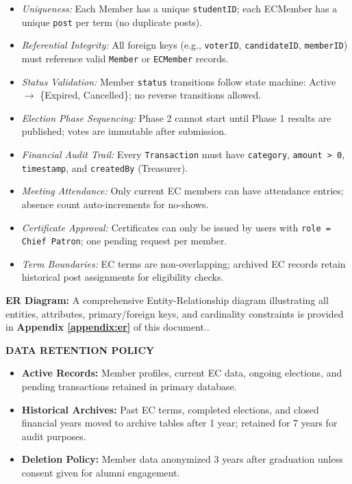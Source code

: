 \documentclass[12pt,a4paper]{article}
\begin{document}
\begin{itemize}[noitemsep]
  \item \textit{Uniqueness:} Each Member has a unique \texttt{studentID}; each ECMember has a unique \texttt{post} per term (no duplicate posts).
  \item \textit{Referential Integrity:} All foreign keys (e.g., \texttt{voterID}, \texttt{candidateID}, \texttt{memberID}) must reference valid \texttt{Member} or \texttt{ECMember} records.
  \item \textit{Status Validation:} Member \texttt{status} transitions follow state machine: Active $\rightarrow$ \{Expired, Cancelled\}; no reverse transitions allowed.
  \item \textit{Election Phase Sequencing:} Phase 2 cannot start until Phase 1 results are published; votes are immutable after submission.
  \item \textit{Financial Audit Trail:} Every \texttt{Transaction} must have \texttt{category}, \texttt{amount > 0}, \texttt{timestamp}, and \texttt{createdBy} (Treasurer).
  \item \textit{Meeting Attendance:} Only current EC members can have attendance entries; absence count auto-increments for no-shows.
  \item \textit{Certificate Approval:} Certificates can only be issued by users with \texttt{role = Chief Patron}; one pending request per member.
  \item \textit{Term Boundaries:} EC terms are non-overlapping; archived EC records retain historical post assignments for eligibility checks.
\end{itemize}

\vspace{4pt}
\begin{tcolorbox}[significancestyle]
\textbf{ER Diagram:} A comprehensive Entity-Relationship diagram illustrating all entities, attributes, primary/foreign keys, and cardinality constraints is provided in \textbf{Appendix \ref{appendix:er}} of this document..
\end{tcolorbox}

\vspace{4pt}
\textbf{\small\color{Teal}DATA RETENTION POLICY}\vspace{4pt}

\begin{itemize}[noitemsep]
  \item \textbf{Active Records:} Member profiles, current EC data, ongoing elections, and pending transactions retained in primary database.
  \item \textbf{Historical Archives:} Past EC terms, completed elections, and closed financial years moved to archive tables after 1 year; retained for 7 years for audit purposes.
  \item \textbf{Deletion Policy:} Member data anonymized 3 years after graduation unless consent given for alumni engagement.
\end{itemize}
\newpage
\end{document}
